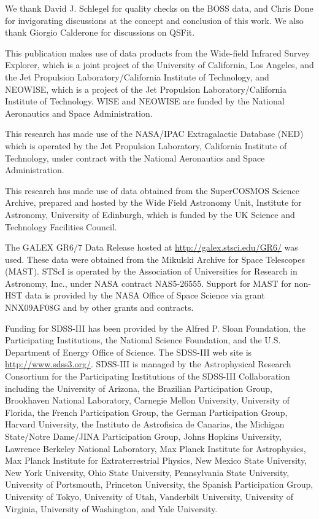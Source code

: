 \documentclass[a4paper,fleqn,usenatbib]{mnras}
\begin{document}
We thank David J. Schlegel for quality checks on the BOSS data, and
Chris Done for invigorating discussions at the concept and conclusion
of this work. We also thank Giorgio Calderone for discussions on 
QSFit.  

This publication makes use of data products from the Wide-field
Infrared Survey Explorer, which is a joint project of the University
of California, Los Angeles, and the Jet Propulsion
Laboratory/California Institute of Technology, and NEOWISE, which is a
project of the Jet Propulsion Laboratory/California Institute of
Technology. WISE and NEOWISE are funded by the National Aeronautics
and Space Administration.

This research has made use of the NASA/IPAC Extragalactic Database
(NED) which is operated by the Jet Propulsion Laboratory, California
Institute of Technology, under contract with the National Aeronautics
and Space Administration.

This research has made use of data obtained from the SuperCOSMOS
Science Archive, prepared and hosted by the Wide Field Astronomy Unit,
Institute for Astronomy, University of Edinburgh, which is funded by
the UK Science and Technology Facilities Council.

The GALEX GR6/7 Data Release hosted at
\href{http://galex.stsci.edu/GR6/}{http://galex.stsci.edu/GR6/} was
used. These data were obtained from the Mikulski Archive for Space
Telescopes (MAST). STScI is operated by the Association of
Universities for Research in Astronomy, Inc., under NASA contract
NAS5-26555. Support for MAST for non-HST data is provided by the NASA
Office of Space Science via grant NNX09AF08G and by other grants and
contracts.

Funding for SDSS-III has been provided by the Alfred P. Sloan
Foundation, the Participating Institutions, the National Science
Foundation, and the U.S. Department of Energy Office of Science. The
SDSS-III web site is
\href{http://www.sdss3.org/}{http://www.sdss3.org/}.
SDSS-III is managed by the Astrophysical Research Consortium for the
Participating Institutions of the SDSS-III Collaboration including the
University of Arizona, the Brazilian Participation Group, Brookhaven
National Laboratory, Carnegie Mellon University, University of
Florida, the French Participation Group, the German Participation
Group, Harvard University, the Instituto de Astrofisica de Canarias,
the Michigan State/Notre Dame/JINA Participation Group, Johns Hopkins
University, Lawrence Berkeley National Laboratory, Max Planck
Institute for Astrophysics, Max Planck Institute for Extraterrestrial
Physics, New Mexico State University, New York University, Ohio State
University, Pennsylvania State University, University of Portsmouth,
Princeton University, the Spanish Participation Group, University of
Tokyo, University of Utah, Vanderbilt University, University of
Virginia, University of Washington, and Yale University.




\bsp	%
\label{lastpage}
\end{document}
